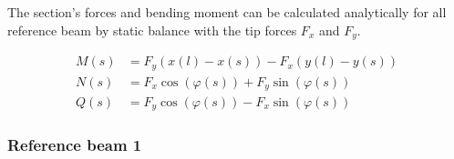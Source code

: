 The section's forces and bending moment can be calculated analytically for all reference beam by static balance with the tip forces $F_{x}$ and $F_{y}$.

\begin{align}
M(s) &= F_{y}\left(x(l) - x(s)\right) - F_{x}\left(y(l) - y(s)\right) \\
N(s) &= F_{x}\cos(\varphi(s)) + F_{y}\sin(\varphi(s)) \\
Q(s) &= F_{y}\cos(\varphi(s)) - F_{x}\sin(\varphi(s))
\end{align}

\newpage
\subsubsection*{Reference beam 1}

%
%
%


